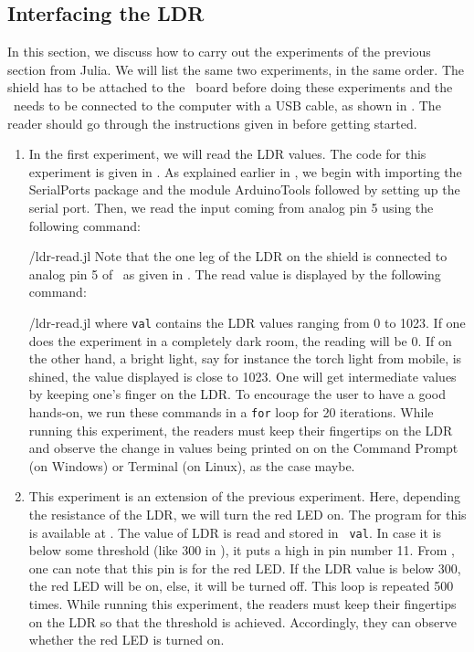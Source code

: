 \subsection{Interfacing the LDR}
In this section, we discuss how to carry out the experiments of the
previous section from Julia.  We will list the same two experiments,
in the same order.  The shield has to be attached to the \arduino\ board
before doing these experiments and the \arduino\ needs to be connected to the computer 
with a USB cable, as shown in .
The reader should go through the instructions given in  before getting started.


\begin{enumerate}
  \item In the first experiment, we will read the LDR values. The code for this experiment is given in
        . As explained earlier in , we begin with importing the SerialPorts 
        \cite{julia-serial-ports} package and the module ArduinoTools followed by setting up the serial port.
        Then, we read the input coming from analog pin 5 using the 
        following command:
        
        {\LocLDRjuliacode/ldr-read.jl} Note that the one leg of the LDR on
        the shield is connected to analog pin 5 of \arduino\, 
        as given in . The read value is displayed 
        by the following command: 
        
        {\LocLDRjuliacode/ldr-read.jl} where {\tt val} contains
        the LDR values ranging from 0 to 1023. If one does the experiment in a completely dark room, the
        reading will be 0. If on the other hand, a bright light, say for instance the torch
        light from mobile, is shined, the value displayed is close to 1023. One will get
        intermediate values by keeping one's finger on the LDR. To
        encourage the user to have a good hands-on, we run these commands in
        a {\tt for} loop for 20 iterations. While running this experiment, the readers must keep their fingertips on the LDR and
        observe the change in values being printed on on the
        Command Prompt (on Windows) or Terminal (on Linux), as the case maybe.
        
        
  \item This experiment is an extension of the previous experiment. Here, depending the resistance of the LDR, we will
        turn the red LED on.  The program for this is available at
        .  The value of LDR is read and stored in {\tt
            val}.  In case it is below some threshold (like 300 in ), 
        it puts a high in pin number 11. From , 
        one can note that this pin is for the red LED.  If the LDR value is below 300, 
        the red LED will be on, else, it will be turned off.  
        This loop is repeated 500 times. While running this experiment, the readers 
        must keep their fingertips on the LDR so that the threshold is achieved. Accordingly, 
        they can observe whether the red LED is turned on. 
\end{enumerate}

